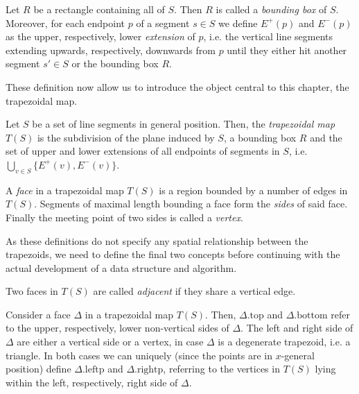     \begin{definition}
        Let $R$ be a rectangle containing all of $S$. Then $R$ is called a \emph{bounding box} of $S$. Moreover, for each endpoint $p$ of a segment $s \in S$ we define $E^+(p)$ and $E^-(p)$ as the upper, respectively, lower \emph{extension} of $p$, i.e. the vertical line segments extending upwards, respectively, downwards from $p$ until they either hit another segment $s' \in S$ or the bounding box $R$.
    \end{definition}

    These definition now allow us to introduce the object central to this chapter, the trapezoidal map.

    \begin{definition}
        Let $S$ be a set of line segments in general position. Then, the \emph{trapezoidal map} $T(S)$ is the subdivision of the plane induced by $S$, a bounding box $R$ and the set of upper and lower extensions of all endpoints of segments in $S$, i.e. $\bigcup_{v \in S} \{E^+(v), E^-(v)\}$.
    \end{definition} 

    \begin{definition}
        A \emph{face} in a trapezoidal map $T(S)$ is a region bounded by a number of edges in $T(S)$. Segments of maximal length bounding a face form the \emph{sides} of said face. Finally the meeting point of two sides is called a \emph{vertex}.
    \end{definition} 

    As these definitions do not specify any spatial relationship between the trapezoids, we need to define the final two concepts before continuing with the actual development of a data structure and algorithm.

    \begin{definition}[Adjacency]
        Two faces in $T(S)$ are called \emph{adjacent} if they share a vertical edge.
    \end{definition}

    \begin{definition}
        Consider a face $\Delta$ in a trapezoidal map $T(S)$. Then, $\Delta.\text{top}$ and $\Delta.\text{bottom}$ refer to the upper, respectively, lower non-vertical sides of $\Delta$. The left and right side of $\Delta$ are either a vertical side or a vertex, in case $\Delta$ is a degenerate trapezoid, i.e. a triangle. In both cases we can uniquely (since the points are in $x$-general position) define $\Delta.\text{leftp}$ and $\Delta.\text{rightp}$, referring to the vertices in $T(S)$ lying within the left, respectively, right side of $\Delta$.
    \end{definition}

